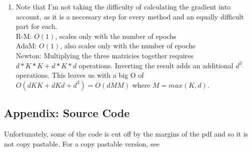 \documentclass[11pt]{article}
\begin{document}
\begin{enumerate}
\begin{enumerate}
\item
Note that I'm not taking the difficulty of calculating the gradient into account, as it is a neccesary step for every method and an equally difficult part for each. \\
R-M: $O(1)$, scales only with the number of epochs \\
AdaM: $O(1)$, also scales only with the number of epochs \\
Newton: Multiplying the three matricies together requires $d*K*K + d*K*d$ operations. Inverting the result adds an additional $d^3$ operations. 
This leaves us with a big O of $O(dKK + dKd + d^3) = O(dMM)$ where $M = max(K, d)$.
\end{enumerate}
\end{enumerate}

\pagebreak
\subsection*{Appendix: Source Code}
Unfortunately, some of the code is cut off by the margins of the pdf and so it is not copy pastable. For a copy pastable version, see 
\end{document}
